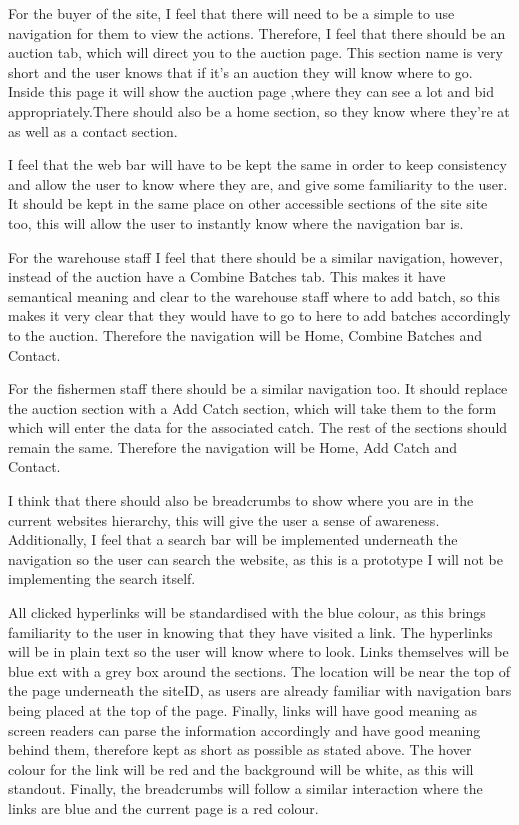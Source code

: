 \documentclass{article}
\begin{document}
For the buyer of the site, I feel that there will need to be a simple to use navigation for them to view the actions. Therefore, I feel that there should be an auction tab, which will direct you to the auction page. This section name is very short and the user knows that if it's an auction they will know where to go. Inside this page it will show the auction page ,where they can see a lot and bid appropriately.There should also be a home section, so they know where they're at as well as a contact section. 

I feel that the web bar will have to be kept the same in order to keep consistency and allow the user to know where they are, and give some familiarity to the user. It should be kept in the same place on other accessible sections of the site site too, this will allow the user to instantly know where the navigation bar is.

For the warehouse staff I feel that there should be a similar navigation, however, instead of the auction have a Combine Batches tab. This makes it have semantical meaning and clear to the warehouse staff where to add batch, so this makes it very clear that they would have to go to here to add batches accordingly to the auction. Therefore the navigation will be Home, Combine Batches and Contact.

For the fishermen staff there should be a similar navigation too. It should replace the auction section with a Add Catch section, which will take them to the form which will enter the data for the associated catch. The rest of the sections should remain the same.  Therefore the navigation will be Home, Add Catch and Contact.

I think that there should also be breadcrumbs to show where you are in the current websites hierarchy, this will give the user a sense of awareness. Additionally, I feel that a search bar will be implemented underneath the navigation so the user can search the website, as this is a prototype I will not be implementing the search itself. 

All clicked hyperlinks will be standardised with the blue colour, as this brings familiarity to the user in knowing that they have visited a link. The hyperlinks will be in plain text so the user will know where to look. Links themselves will be blue ext with a grey box around the sections. The location will be near the top of the page underneath the siteID, as users are already familiar with navigation bars being placed at the top of the page. Finally, links will have good meaning as screen readers can parse the information accordingly and have good meaning behind them, therefore kept as short as possible as stated above. The hover colour for the link will be red and the background will be white, as this will standout. Finally, the breadcrumbs will follow a similar interaction where the links are blue and the current page is a red colour.\cite{LinkColour}
\end{document}
